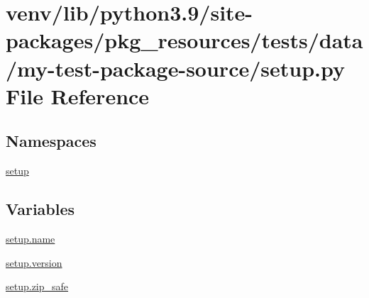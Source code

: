 \hypertarget{pkg__resources_2tests_2data_2my-test-package-source_2setup_8py}{}\section{venv/lib/python3.9/site-\/packages/pkg\+\_\+resources/tests/data/my-\/test-\/package-\/source/setup.py File Reference}
\label{pkg__resources_2tests_2data_2my-test-package-source_2setup_8py}
\subsection*{Namespaces}
\begin{DoxyCompactItemize}
\item 
 \hyperlink{namespacesetup}{setup}
\end{DoxyCompactItemize}
\subsection*{Variables}
\begin{DoxyCompactItemize}
\item 
\hyperlink{namespacesetup_ab3a7a0638d76a01367c5bc3cc699447f}{setup.\+name}
\item 
\hyperlink{namespacesetup_a2aa722b36a933088812b50ea79b97a5c}{setup.\+version}
\item 
\hyperlink{namespacesetup_a13510753661cb74083a0c664db11dde9}{setup.\+zip\+\_\+safe}
\end{DoxyCompactItemize}
